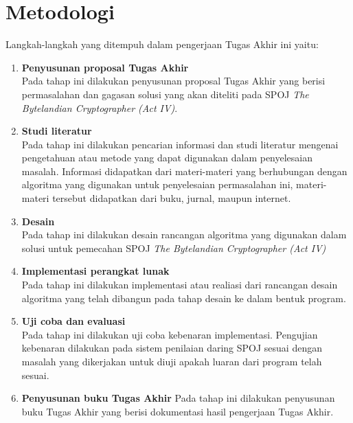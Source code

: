     \section{Metodologi}
    \label{metodologi}
	Langkah-langkah yang ditempuh dalam pengerjaan Tugas Akhir ini yaitu:
    \begin{enumerate}
    	\item \textbf{Penyusunan proposal Tugas Akhir} \\
		       Pada tahap ini dilakukan penyusunan proposal Tugas Akhir yang berisi permasalahan dan gagasan solusi yang akan diteliti pada SPOJ \textit{The Bytelandian Cryptographer (Act IV)}.
    	\item \textbf{Studi literatur}\\
		    	Pada tahap ini dilakukan pencarian informasi dan studi literatur mengenai pengetahuan atau metode yang dapat digunakan dalam penyelesaian masalah. Informasi didapatkan dari materi-materi yang berhubungan dengan algoritma yang digunakan untuk penyelesaian permasalahan ini, materi-materi tersebut didapatkan dari buku, jurnal, maupun internet.
    	\item \textbf{Desain}\\
		    	Pada tahap ini dilakukan desain rancangan algoritma yang digunakan dalam solusi untuk pemecahan SPOJ \textit{The Bytelandian Cryptographer (Act IV)} 
    	\item \textbf{Implementasi perangkat lunak}\\
		    	Pada tahap ini dilakukan implementasi atau realiasi dari rancangan desain algoritma yang telah dibangun pada tahap desain ke dalam bentuk program.
		 \item \textbf{Uji coba dan evaluasi}\\
		 Pada tahap ini dilakukan uji coba kebenaran implementasi. Pengujian kebenaran dilakukan pada sistem penilaian daring SPOJ sesuai dengan masalah yang dikerjakan untuk diuji apakah luaran dari program telah sesuai.
		 \item \textbf{Penyusunan buku Tugas Akhir}
		  Pada tahap ini dilakukan penyusunan buku Tugas Akhir yang berisi dokumentasi hasil pengerjaan Tugas Akhir.
	   	\end{enumerate}
	   	

